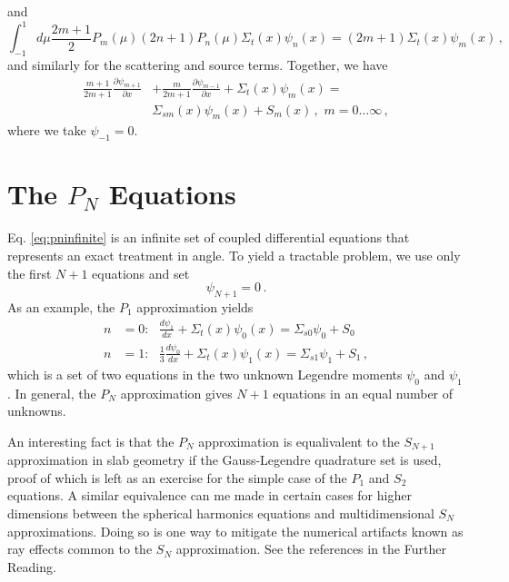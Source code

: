 and
\begin{equation}
 \int^{1}_{-1} d\mu \frac{2m+1}{2}P_m(\mu) (2n+1)P_n(\mu) \Sigma_t(x)\psi_n(x)  = (2m+1) \Sigma_t(x) \psi_m(x) \, ,
\end{equation}
and similarly for the scattering and source terms.  Together, we have
\begin{equation}
\begin{split}
 \frac{m+1}{2m+1}\frac{\partial \psi_{m+1}}{\partial x} &+ \frac{m}{2m+1}\frac{\partial \psi_{m-1}}{\partial x} +  \Sigma_t(x) \psi_m(x) = \\
  & \Sigma_{sm}(x) \psi_m(x) + S_m(x) \, , \, \, m = 0 \ldots \infty \, ,
\end{split}
\label{eq:pninfinite}
\end{equation}
where we take $\psi_{-1} = 0$.

\section*{The $P_N$ Equations}

Eq. \ref{eq:pninfinite} is an infinite set of coupled differential equations that represents an exact treatment in angle.  To yield a tractable problem, we  use only the first $N+1$ equations and set
\begin{equation}
 \psi_{N+1}= 0 \, .
 \label{eq:pnapprox}
\end{equation}
As an example, the $P_1$ approximation yields
\begin{equation}
 \begin{split}
  n &= 0: \, \, \, \, \frac{d\psi_1}{dx} + \Sigma_t(x)\psi_0 (x) = \Sigma_{s0}\psi_0 + S_0 \\
  n &= 1: \, \, \, \, \frac{1}{3}\frac{d\psi_0}{dx} + \Sigma_t(x)\psi_1 (x) = \Sigma_{s1}\psi_1 + S_1 \, ,
 \end{split}
 \label{eq:p1approx}
\end{equation}
which is a set of two equations in the two unknown Legendre moments $\psi_0$ and $\psi_1$.  In general, the $P_N$ approximation gives $N+1$ equations in an equal number of unknowns.

An interesting fact is that the $P_N$ approximation is equalivalent to the $S_{N+1}$ approximation in slab geometry if the Gauss-Legendre quadrature set is used, proof of which is left as an exercise for the simple case of the $P_1$ and $S_2$ equations.  A similar equivalence can me made in certain cases for higher dimensions between the spherical harmonics equations and multidimensional $S_N$ approximations.  Doing so is one way to mitigate the numerical artifacts known as ray effects common to the $S_N$ approximation.  See the references in the Further Reading.

